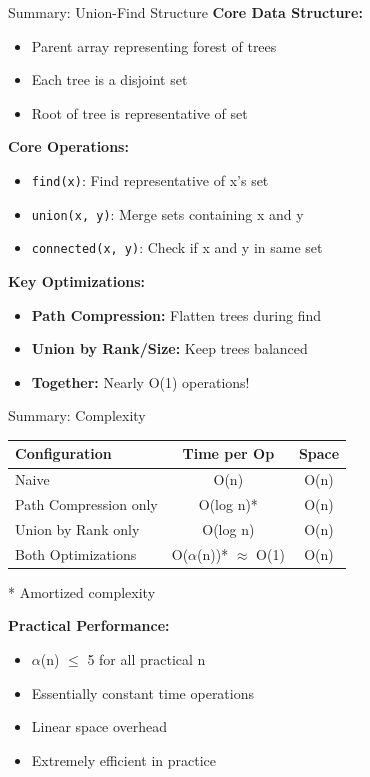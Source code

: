 \documentclass[aspectratio=169]{beamer}
\begin{document}
\begin{frame}{Summary: Union-Find Structure}
  \textbf{Core Data Structure:}
  \begin{itemize}
    \item Parent array representing forest of trees
    \item Each tree is a disjoint set
    \item Root of tree is representative of set
  \end{itemize}

  \vspace{0.5cm}
  \textbf{Core Operations:}
  \begin{itemize}
    \item \texttt{find(x)}: Find representative of x's set
    \item \texttt{union(x, y)}: Merge sets containing x and y
    \item \texttt{connected(x, y)}: Check if x and y in same set
  \end{itemize}

  \vspace{0.5cm}
  \textbf{Key Optimizations:}
  \begin{itemize}
    \item \textbf{Path Compression:} Flatten trees during find
    \item \textbf{Union by Rank/Size:} Keep trees balanced
    \item \textbf{Together:} Nearly O(1) operations!
  \end{itemize}
\end{frame}

\begin{frame}{Summary: Complexity}
  \begin{table}
    \centering
    \begin{tabular}{|l|c|c|}
      \hline
      \textbf{Configuration} & \textbf{Time per Op} & \textbf{Space} \\
      \hline
      Naive & O(n) & O(n) \\
      \hline
      Path Compression only & O(log n)* & O(n) \\
      \hline
      Union by Rank only & O(log n) & O(n) \\
      \hline
      Both Optimizations & O($\alpha$(n))* $\approx$ O(1) & O(n) \\
      \hline
    \end{tabular}
  \end{table}

  \vspace{0.3cm}
  * Amortized complexity

  \vspace{0.5cm}
  \textbf{Practical Performance:}
  \begin{itemize}
    \item $\alpha$(n) $\leq$ 5 for all practical n
    \item Essentially constant time operations
    \item Linear space overhead
    \item Extremely efficient in practice
  \end{itemize}
\end{frame}
\end{document}
